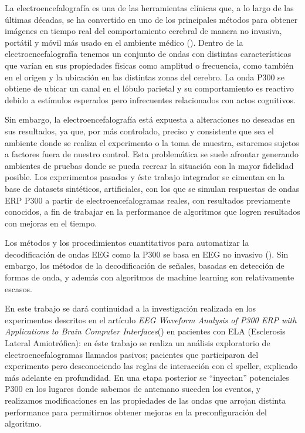 \documentclass[../00_Main.tex]{subfiles}
\begin{document}
La electroencefalografía es una de las herramientas clínicas que, a lo largo de las últimas décadas, se ha convertido en uno de los principales métodos para obtener imágenes en tiempo real del comportamiento cerebral de manera no invasiva, portátil y móvil más usado en el ambiente médico (\cite{Atlas}). Dentro de la electroencefalografía tenemos un conjunto de ondas con distintas características que varían en sus propiedades físicas como amplitud o frecuencia, como también en el origen y la ubicación en las distintas zonas del cerebro. La onda P300 se obtiene de ubicar un canal en el lóbulo parietal y su comportamiento es reactivo debido a estímulos esperados pero infrecuentes relacionados con actos cognitivos. 

Sin embargo, la electroencefalografía está expuesta a alteraciones no deseadas en sus resultados, ya que, por más controlado, preciso y consistente que sea el ambiente donde se realiza el experimento o la toma de muestra, estaremos sujetos a factores fuera de nuestro control. Esta problemática se suele afrontar generando ambientes de pruebas donde se pueda recrear la situación con la mayor fidelidad posible. Los experimentos pasados y éste trabajo integrador se cimentan en la base de datasets sintéticos, artificiales, con los que se simulan respuestas de ondas ERP P300 a partir de electroencefalogramas reales, con resultados previamente conocidos, a fin de trabajar en la performance de algoritmos que logren resultados con mejoras en el tiempo.

Los métodos y los procedimientos cuantitativos para automatizar la decodificación de ondas EEG como la P300 se basa en EEG no invasivo (\cite{IntroductionBCIR}). Sin embargo, los métodos de la decodificación de señales, basadas en detección de formas de onda, y además con algoritmos de machine learning son relativamente escasos. 

En este trabajo se dará continuidad a la investigación realizada en los experimentos descritos en el artículo \textit{EEG Waveform Analysis of P300 ERP with Applications to Brain Computer Interfaces}(\cite{EEGAnalysisBCI}) en pacientes con ELA (Esclerosis Lateral Amiotrófica): en éste trabajo se realiza un análisis exploratorio de electroencefalogramas llamados pasivos; pacientes que participaron del experimento pero desconociendo las reglas de interacción con el speller, explicado más adelante en profundidad. En una etapa posterior se “inyectan” potenciales P300 en los lugares donde sabemos de antemano suceden los eventos, y realizamos modificaciones en las propiedades de las ondas que arrojan distinta performance para permitirnos obtener mejoras en la preconfiguración del algoritmo.
\end{document}
